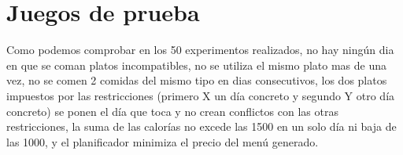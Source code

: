 \section{Juegos de prueba}

Como podemos comprobar en los 50 experimentos realizados, no hay ningún dia en que se coman platos incompatibles, no se utiliza el mismo plato mas de una vez, no se comen 2 comidas del mismo tipo en dias consecutivos, los dos platos impuestos por las restricciones (primero X un día concreto y segundo Y otro día concreto) se ponen el día que toca y no crean conflictos con las otras restricciones, la suma de las calorías no excede las 1500 en un solo día ni baja de las 1000, y el planificador minimiza el precio del menú generado.
